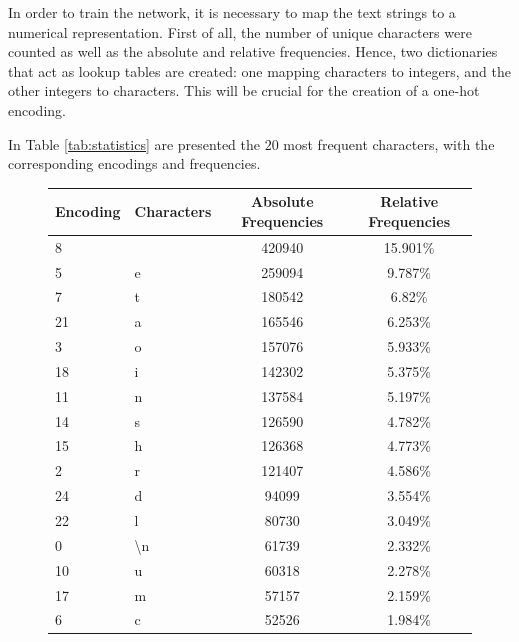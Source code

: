 \documentclass[a4paper,12pt]{article} %
\begin{document}
 	In order to train the network, it is necessary to map the text strings to a 
 	numerical representation. First of all,	the number of unique characters 
 	were counted as well as the absolute and relative frequencies. Hence, two 
 	dictionaries that act as lookup tables are created: one mapping characters 
 	to integers, and the other integers to characters. This will be crucial for 
 	the creation of a one-hot encoding.
 	
 	In Table \ref{tab:statistics} are presented the $20$ most frequent 
 	characters, with the corresponding encodings and frequencies.
	
	\begin{figure}[htb]
		\centering
		\begin{tabular}{llcc}
			\toprule
			Encoding & Characters &  Absolute Frequencies & Relative 
			Frequencies \\
			\midrule
			8        &           &              420940 &            15.901\% \\
			5        &         e &              259094 &             9.787\% \\
			7        &         t &              180542 &              6.82\% \\
			21       &         a &              165546 &             6.253\% \\
			3        &         o &              157076 &             5.933\% \\
			18       &         i &              142302 &             5.375\% \\
			11       &         n &              137584 &             5.197\% \\
			14       &         s &              126590 &             4.782\% \\
			15       &         h &              126368 &             4.773\% \\
			2        &         r &              121407 &             4.586\% \\
			24       &         d &               94099 &             3.554\% \\
			22       &         l &               80730 &             3.049\% \\
			0        &        \textbackslash n &               61739 
			& 2.332\% \\
			10       &         u &               60318 &             2.278\% \\
			17       &         m &               57157 &             2.159\% \\
			6        &         c &               52526 &             1.984\% \\

\end{tabular}
\end{figure}
\end{document}
